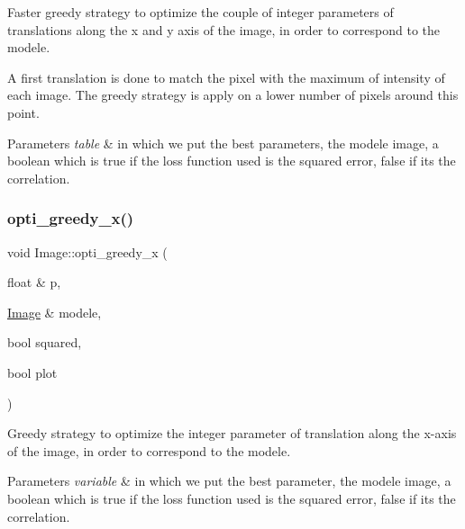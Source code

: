 Faster greedy strategy to optimize the couple of integer parameters of translations along the x and y axis of the image, in order to correspond to the modele. 

A first translation is done to match the pixel with the maximum of intensity of each image. The greedy strategy is apply on a lower number of pixels around this point.


\begin{DoxyParams}{Parameters}
{\em table} & in which we put the best parameters, the modele image, a boolean which is true if the loss function used is the squared error, false if it\textquotesingle{}s the correlation. \\
\hline
\end{DoxyParams}
\mbox{\label{class_image_a81319b99e3a51f1edc87c1b37ecaf677}} 
\subsubsection{\texorpdfstring{opti\+\_\+greedy\+\_\+x()}{opti\_greedy\_x()}}
{\footnotesize\ttfamily void Image\+::opti\+\_\+greedy\+\_\+x (\begin{DoxyParamCaption}\item[{float \&}]{p,  }\item[{\hyperlink{class_image}{Image} \&}]{modele,  }\item[{bool}]{squared,  }\item[{bool}]{plot }\end{DoxyParamCaption})}



Greedy strategy to optimize the integer parameter of translation along the x-\/axis of the image, in order to correspond to the modele. 


\begin{DoxyParams}{Parameters}
{\em variable} & in which we put the best parameter, the modele image, a boolean which is true if the loss function used is the squared error, false if it\textquotesingle{}s the correlation. \\
\hline
\end{DoxyParams}
\mbox{\label{class_image_aa88be19239da61154efd07ab51a4e316}} 
